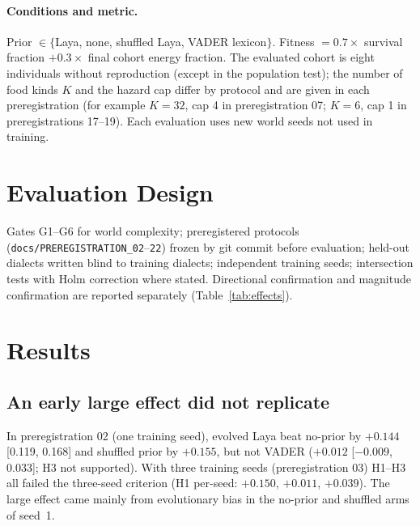 \documentclass[11pt]{article}
\begin{document}
\paragraph{Conditions and metric.} Prior $\in\{$Laya, none, shuffled Laya, VADER lexicon$\}$. Fitness $=0.7\times$ survival fraction $+0.3\times$ final cohort energy fraction. The evaluated cohort is eight individuals without reproduction (except in the population test); the number of food kinds $K$ and the hazard cap differ by protocol and are given in each preregistration (for example $K=32$, cap 4 in preregistration 07; $K=6$, cap 1 in preregistrations 17--19). Each evaluation uses new world seeds not used in training.

\section{Evaluation Design}
Gates G1--G6 for world complexity; preregistered protocols (\texttt{docs/PREREGISTRATION\_02}--\texttt{22}) frozen by git commit before evaluation; held-out dialects written blind to training dialects; independent training seeds; intersection tests with Holm correction where stated. Directional confirmation and magnitude confirmation are reported separately (Table~\ref{tab:effects}).

\section{Results}\label{sec:results}
\subsection{An early large effect did not replicate}
In preregistration 02 (one training seed), evolved Laya beat no-prior by $+0.144$ [0.119, 0.168] and shuffled prior by $+0.155$, but not VADER ($+0.012$ [$-0.009$, 0.033]; H3 not supported). With three training seeds (preregistration 03) H1--H3 all failed the three-seed criterion (H1 per-seed: $+0.150$, $+0.011$, $+0.039$). The large effect came mainly from evolutionary bias in the no-prior and shuffled arms of seed~1.
\end{document}
